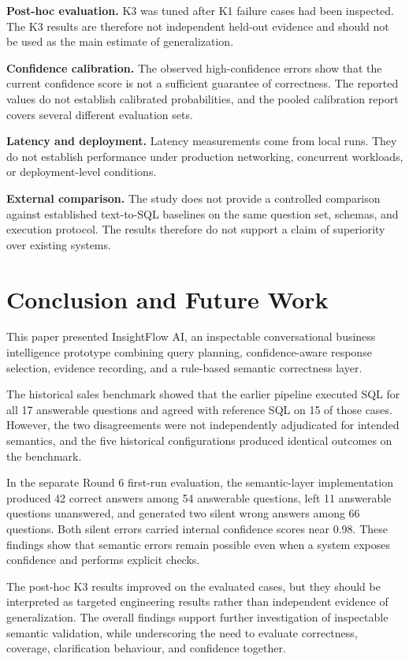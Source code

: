 \documentclass[conference]{IEEEtran}
\begin{document}
\textbf{Post-hoc evaluation.} K3 was tuned after K1 failure cases had been inspected. The K3 results are therefore not independent held-out evidence and should not be used as the main estimate of generalization.

\textbf{Confidence calibration.} The observed high-confidence errors show that the current confidence score is not a sufficient guarantee of correctness. The reported values do not establish calibrated probabilities, and the pooled calibration report covers several different evaluation sets.

\textbf{Latency and deployment.} Latency measurements come from local runs. They do not establish performance under production networking, concurrent workloads, or deployment-level conditions.

\textbf{External comparison.} The study does not provide a controlled comparison against established text-to-SQL baselines on the same question set, schemas, and execution protocol. The results therefore do not support a claim of superiority over existing systems.

\section{Conclusion and Future Work}

This paper presented InsightFlow AI, an inspectable conversational business intelligence prototype combining query planning, confidence-aware response selection, evidence recording, and a rule-based semantic correctness layer.

The historical sales benchmark showed that the earlier pipeline executed SQL for all 17 answerable questions and agreed with reference SQL on 15 of those cases. However, the two disagreements were not independently adjudicated for intended semantics, and the five historical configurations produced identical outcomes on the benchmark.

In the separate Round 6 first-run evaluation, the semantic-layer implementation produced 42 correct answers among 54 answerable questions, left 11 answerable questions unanswered, and generated two silent wrong answers among 66 questions. Both silent errors carried internal confidence scores near 0.98. These findings show that semantic errors remain possible even when a system exposes confidence and performs explicit checks.

The post-hoc K3 results improved on the evaluated cases, but they should be interpreted as targeted engineering results rather than independent evidence of generalization. The overall findings support further investigation of inspectable semantic validation, while underscoring the need to evaluate correctness, coverage, clarification behaviour, and confidence together.
\end{document}
